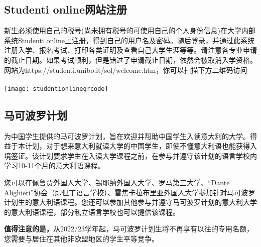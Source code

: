 \subsection{Studenti online网站注册}
新生必须使用自己的税号(尚未拥有税号的可使用自己的个人身份信息)在大学内部系统Studenti online上注册，得到自己的用户名及密码。随后登录，并通过此系统注册入学、报名考试、打印各类证明及查看自己大学生涯等等。请注意各专业申请的截止日期。如果考试顺利，但是错过了申请截止日期，依然会被取消入学资格。\\
网站为https://studenti.unibo.it/sol/welcome.htm，你可以扫描下方二维码访问\\
\\
\texttt{[image: studentionlineqrcode]}\\

\subsection{马可波罗计划}
为中国学生提供的马可波罗计划，旨在欢迎并帮助中国学生入读意大利的大学。得益于本计划，对于想来意大利就读大学的中国学生，即使不懂意大利语也能获得入境签证。该计划要求学生在入读大学课程之前，在参与并遵守该计划的语言学校内学习10-11个月的意大利语课程。


您可以在佩鲁贾外国人大学、锡耶纳外国人大学、罗马第三大学、“Dante Alighieri”协会（即但丁语言学校）、雷焦卡拉布里亚外国人大学参加针对马可波罗计划生的意大利语课程。您还可以参加其他参与并遵守马可波罗计划的意大利大学的意大利语课程，部分私立语言学校也可以提供该课程。


\textbf{值得注意的是，}从2022/23学年起，马可波罗计划生将不再享有以往的专用名额，您需要与居住在其他非欧盟地区的学生平等竞争。\\

